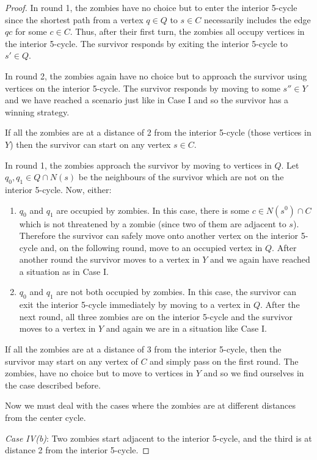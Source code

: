 \begin{proof}
In round 1, the zombies have no choice but to enter the interior 5-cycle since the shortest path from a vertex $q \in Q$ to
$s \in C$ necessarily includes the edge $qc$ for some $c \in C$. Thus, after their first turn, the zombies all occupy vertices in the interior 5-cycle.
The survivor responds by exiting the interior 5-cycle to $s' \in Q$.

In round 2, the zombies again have no choice but to approach the survivor using vertices on the interior 5-cycle. The survivor responds by moving to
some $s'' \in Y$ and we have reached a scenario just like in Case I and so the survivor has a winning strategy.

If all the zombies are at a distance of 2 from the interior 5-cycle (those vertices in $Y$) then the survivor can start on any vertex $s \in C$.

In round 1, the zombies approach the survivor by moving to vertices in $Q$. Let $q_0, q_1 \in Q \cap N(s)$ be the neighbours of the survivor
which are not on the interior 5-cycle. Now, either:

\begin{enumerate}
\item $q_0$ and $q_1$ are occupied by zombies. In this case, there is some $c \in N(s^0) \cap C$ which is not threatened by a zombie (since two of them are adjacent
to $s$). Therefore the survivor can safely move onto another vertex on the interior 5-cycle and, on the following round, move to an occupied vertex in $Q$. After
another round the survivor moves to a vertex in $Y$ and we again have reached a situation as in Case I.

\item $q_0$ and $q_1$ are not both occupied by zombies. In this case, the survivor can exit the interior 5-cycle immediately by moving to a vertex in $Q$. After
 the next round, all three zombies are on the interior 5-cycle and the survivor moves to a vertex in $Y$ and again we are in a situation like Case I.
\end{enumerate}

If all the zombies are at a distance of 3 from the interior 5-cycle, then the survivor may start on any vertex of $C$ and simply pass on the first round. The zombies,
have no choice but to move to vertices in $Y$ and so we find ourselves in the case described before.

Now we must deal with the cases where the zombies are at different distances from the center cycle.

\textit{Case IV(b)}: Two zombies start adjacent to the interior 5-cycle, and the third is at distance 2 from the interior 5-cycle.


\end{proof}
